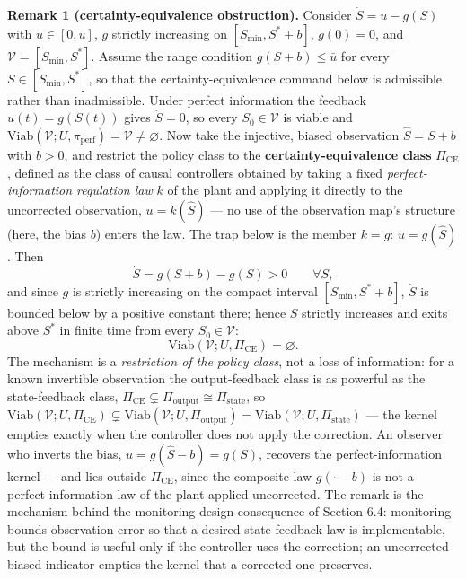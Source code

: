 \documentclass[11pt]{article}
\begin{document}
\textbf{Remark 1 (certainty-equivalence obstruction).} Consider
\(\dot S = u - g(S)\) with \(u \in [0, \bar u]\), \(g\) strictly
increasing on \([S_{\min}, S^* + b]\), \(g(0) = 0\), and
\(\mathcal{V} = [S_{\min}, S^*]\). Assume the range condition
\(g(S + b) \le \bar u\) for every \(S \in [S_{\min}, S^*]\), so that the
certainty-equivalence command below is admissible rather than
inadmissible. Under perfect information the feedback \(u(t) = g(S(t))\)
gives \(\dot S = 0\), so every \(S_0 \in \mathcal{V}\) is viable and
\(\mathrm{Viab}(\mathcal{V}; U, \pi_{\mathrm{perf}}) = \mathcal{V} \neq \varnothing\).
Now take the injective, biased observation \(\hat S = S + b\) with
\(b > 0\), and restrict the policy class to the
\textbf{certainty-equivalence class} \(\Pi_{\mathrm{CE}}\), defined as the class of causal controllers obtained by taking a fixed \emph{perfect-information
regulation law} \(k\) of the plant and applying it directly to the
uncorrected observation, \(u = k(\hat S)\) --- no use of the observation
map's structure (here, the bias \(b\)) enters the law. The trap below is
the member \(k = g\): \(u = g(\hat S)\). Then
\[\dot S = g(S + b) - g(S) > 0 \qquad \forall S,\] and since \(g\) is
strictly increasing on the compact interval \([S_{\min}, S^* + b]\),
\(\dot S\) is bounded below by a positive constant there; hence \(S\)
strictly increases and exits above \(S^*\) in finite time from every
\(S_0 \in \mathcal{V}\):
\[\mathrm{Viab}(\mathcal{V}; U, \Pi_{\mathrm{CE}}) = \varnothing.\] The
mechanism is a \emph{restriction of the policy class}, not a loss of
information: for a known invertible observation the output-feedback
class is as powerful as the state-feedback class,
\(\Pi_{\mathrm{CE}} \subsetneq \Pi_{\mathrm{output}} \cong \Pi_{\mathrm{state}}\),
so
\(\mathrm{Viab}(\mathcal{V}; U, \Pi_{\mathrm{CE}}) \subsetneq \mathrm{Viab}(\mathcal{V}; U, \Pi_{\mathrm{output}}) = \mathrm{Viab}(\mathcal{V}; U, \Pi_{\mathrm{state}})\)
--- the kernel empties exactly when the controller does not apply the correction. An observer who inverts the bias,
\(u = g(\hat S - b) = g(S)\), recovers the perfect-information kernel
--- and lies outside \(\Pi_{\mathrm{CE}}\), since the composite law
\(g(\cdot - b)\) is not a perfect-information law of the plant applied
uncorrected. The remark is the mechanism behind the monitoring-design
consequence of Section 6.4: monitoring bounds observation error so that
a desired state-feedback law is implementable, but the bound is useful
only if the controller uses the correction; an uncorrected biased
indicator empties the kernel that a corrected one preserves.
\end{document}
